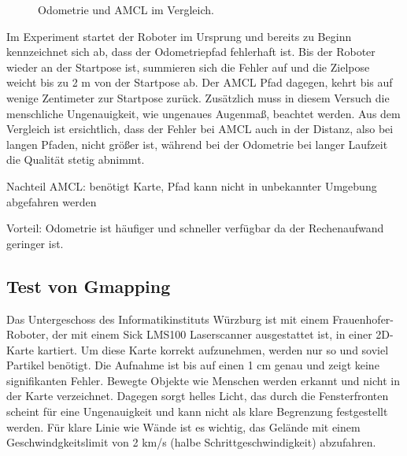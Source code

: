\documentclass[11pt,a4paper]{article}
\begin{document}
{\begin{figure}[h]
	\centering
	\par\medskip
	\caption{ Odometrie und AMCL im Vergleich. }
\end{figure}




Im Experiment startet der Roboter im Ursprung und bereits zu Beginn kennzeichnet sich ab, dass der Odometriepfad fehlerhaft ist. Bis der Roboter wieder an der Startpose ist, summieren sich die Fehler auf und die Zielpose weicht bis zu 2 m von der Startpose ab. Der AMCL Pfad dagegen, kehrt bis auf wenige Zentimeter zur Startpose zur\"uck. Zus\"atzlich muss in diesem Versuch die menschliche Ungenauigkeit, wie ungenaues Augenma{\ss}, beachtet werden. Aus dem Vergleich ist ersichtlich, dass der Fehler bei AMCL auch in der Distanz, also bei langen Pfaden, nicht gr\"o{\ss}er ist, w\"ahrend bei der Odometrie bei langer Laufzeit die Qualit\"at stetig abnimmt.


Nachteil AMCL: benötigt Karte, Pfad kann nicht in unbekannter Umgebung abgefahren werden

Vorteil: Odometrie ist h\"aufiger und schneller verf\"ugbar da der Rechenaufwand geringer ist. 






\subsection{Test von Gmapping}
{
	Das Untergeschoss des Informatikinstituts W\"urzburg ist mit einem Frauenhofer-Roboter, der mit einem Sick LMS100 Laserscanner ausgestattet ist, in einer 2D-Karte kartiert.  Um diese Karte korrekt aufzunehmen, werden nur so und soviel Partikel ben\"otigt. Die Aufnahme ist bis auf einen 1 cm genau und zeigt keine signifikanten Fehler. Bewegte Objekte wie Menschen werden erkannt und nicht in der Karte verzeichnet. Dagegen sorgt helles Licht, das durch die Fensterfronten scheint f\"ur eine Ungenauigkeit und kann nicht als klare Begrenzung festgestellt werden. F\"ur klare Linie wie W\"ande ist es wichtig, das Gel\"ande mit einem Geschwindgkeitslimit von 2 km/s (halbe Schrittgeschwindigkeit) abzufahren. 
	
}}
\end{document}
